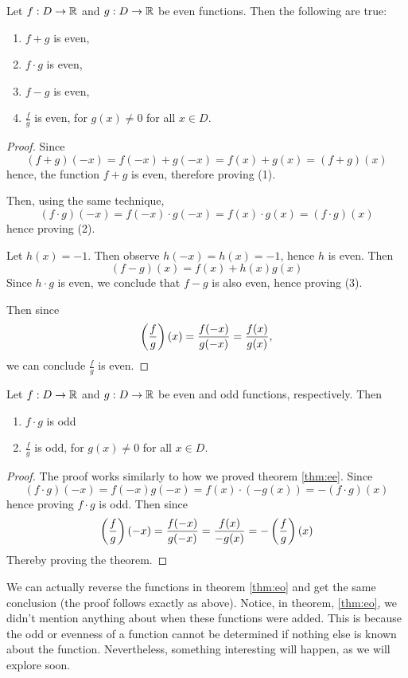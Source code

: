 \begin{theorem}
\label{thm:ee}
	Let $f: D\to\mathbb{R}$ and $g: D\to\mathbb{R}$ be even functions. Then the following are true:
	\begin{enumerate}
		\item $f+g$ is even,
		\item $f\cdot g$ is even,
		\item $f-g$ is even,
		\item $\frac{f}{g}$ is even, for $g(x)\neq 0$ for all $x\in D$. 
	\end{enumerate}
\end{theorem}
\begin{proof}
	Since
	$$(f+g)(-x)=f(-x)+g(-x)=f(x)+g(x)=(f+g)(x)$$
	hence, the function $f+g$ is even, therefore proving (1).
	
	Then, using the same technique,
	$$(f\cdot g)(-x)=f(-x)\cdot g(-x)=f(x)\cdot g(x)=(f\cdot g)(x)$$
	hence proving (2).
	
	Let $h(x)=-1$. Then observe $h(-x)=h(x)=-1$, hence $h$ is even. Then
	$$(f-g)(x)=f(x)+h(x)g(x)$$
	Since $h\cdot g$ is even, we conclude that $f-g$ is also even, hence proving (3).
	
	Then since
	$$\left(\frac{f}{g}\right)(x)=\frac{f(-x)}{g(-x)}=\frac{f(x)}{g(x)},$$
	we can conclude $\frac{f}{g}$ is even.
\end{proof}

\begin{theorem}
\label{thm:eo}
Let $f: D\to\mathbb{R}$ and $g: D\to\mathbb{R}$ be even and odd functions, respectively. Then
\begin{enumerate}
	\item $f\cdot g$ is odd
	\item $\frac{f}{g}$ is odd, for $g(x)\neq 0$ for all $x\in D$. 
\end{enumerate}
\end{theorem}
\begin{proof}
	The proof works similarly to how we proved theorem \eqref{thm:ee}.
	Since
	$$(f\cdot g)(-x)=f(-x)g(-x)=f(x)\cdot (-g(x))=-(f\cdot g)(x)$$
	hence proving $f\cdot g$ is odd.
	Then since
	$$\left(\frac{f}{g}\right)(-x)=\frac{f(-x)}{g(-x)}=\frac{f(x)}{-g(x)}=-\left(\frac{f}{g}\right)(x)$$
	Thereby proving the theorem.
\end{proof}
 We can actually reverse the functions in theorem \eqref{thm:eo} and get the same conclusion (the proof follows exactly as above).
 Notice, in theorem, \eqref{thm:eo}, we didn't mention anything about when these functions were added.
 This is because the odd or evenness of a function cannot be determined if nothing else is known about the function. Nevertheless, something interesting will happen, as we will explore soon.

